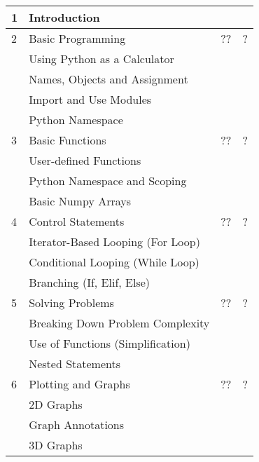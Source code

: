 \begin{longtable}{|p{2.0cm}|p{7.6cm}|p{2.0cm}|p{1.8cm}|}
             1  & Introduction                               &    &    \\
             \hline
             2  & Basic Programming                          & ?? & ?  \\
                & \qquad Using Python as a Calculator        &    &    \\
                & \qquad Names, Objects and Assignment       &    &    \\
                & \qquad Import and Use Modules              &    &    \\
                & \qquad Python Namespace                    &    &    \\
             \hline
             3  & Basic Functions                            & ?? & ?  \\
                & \qquad User-defined Functions              &    &    \\
                & \qquad Python Namespace and Scoping        &    &    \\
                & \qquad Basic Numpy Arrays                  &    &    \\
             \hline
             4  & Control Statements                         & ?? & ?  \\
                & \qquad Iterator-Based Looping (For Loop)   &    &    \\
                & \qquad Conditional Looping (While Loop)    &    &    \\
                & \qquad Branching (If, Elif, Else)          &    &    \\
             \hline
             5  & Solving Problems                           & ?? & ?  \\
                & \qquad Breaking Down Problem Complexity    &    &    \\
                & \qquad Use of Functions (Simplification)   &    &    \\
                & \qquad Nested Statements                   &    &    \\
             \hline
             6  & Plotting and Graphs                        & ?? & ?  \\
                & \qquad 2D Graphs                           &    &    \\
                & \qquad Graph Annotations                   &    &    \\
                & \qquad 3D Graphs                           &    &    \\

\end{longtable}
